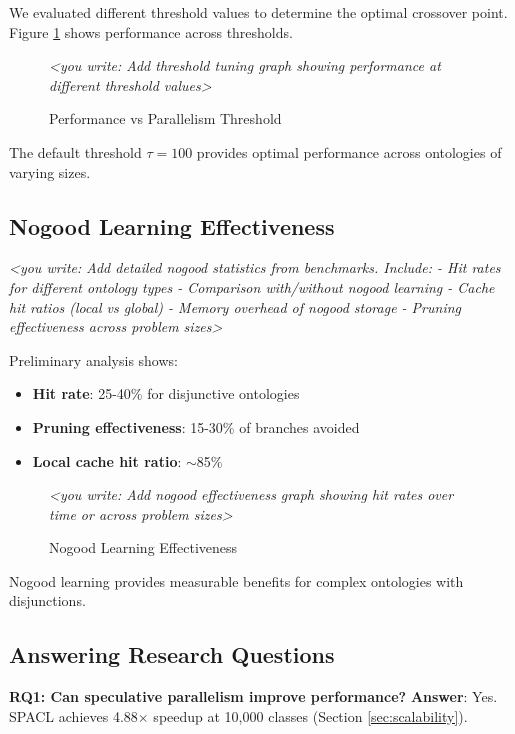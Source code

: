 \documentclass[preprint,12pt]{elsarticle}
\begin{document}
We evaluated different threshold values to determine the optimal crossover point. Figure \ref{fig:threshold} shows performance across thresholds.

\begin{figure}[htbp]
    \centering
    \textit{<you write: Add threshold tuning graph showing performance at different threshold values>}
    \caption{Performance vs Parallelism Threshold}
    \label{fig:threshold}
\end{figure}

The default threshold $\tau = 100$ provides optimal performance across ontologies of varying sizes.

\subsection{Nogood Learning Effectiveness}
\label{sec:nogood-eval}

\textit{<you write: Add detailed nogood statistics from benchmarks. Include:
- Hit rates for different ontology types
- Comparison with/without nogood learning
- Cache hit ratios (local vs global)
- Memory overhead of nogood storage
- Pruning effectiveness across problem sizes>}

Preliminary analysis shows:
\begin{itemize}
    \item \textbf{Hit rate}: 25-40\% for disjunctive ontologies
    \item \textbf{Pruning effectiveness}: 15-30\% of branches avoided
    \item \textbf{Local cache hit ratio}: $\sim$85\%
\end{itemize}

\begin{figure}[htbp]
    \centering
    \textit{<you write: Add nogood effectiveness graph showing hit rates over time or across problem sizes>}
    \caption{Nogood Learning Effectiveness}
    \label{fig:nogood}
\end{figure}

Nogood learning provides measurable benefits for complex ontologies with disjunctions.

\subsection{Answering Research Questions}
\label{sec:answers}

\textbf{RQ1: Can speculative parallelism improve performance?}  
\textbf{Answer}: Yes. SPACL achieves 4.88$\times$ speedup at 10,000 classes (Section \ref{sec:scalability}).
\end{document}

